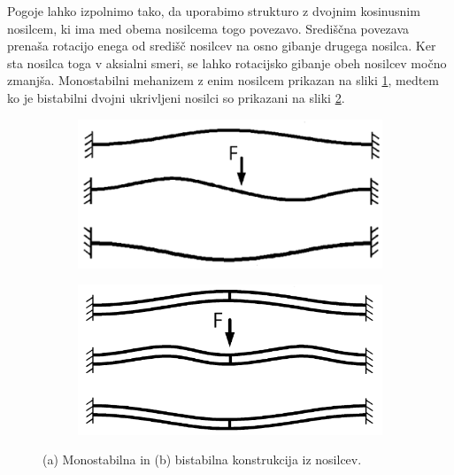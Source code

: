         Pogoje lahko izpolnimo tako, da uporabimo strukturo z dvojnim kosinusnim nosilcem, ki ima med obema nosilcema togo povezavo. Središčna povezava prenaša rotacijo enega od središč nosilcev na osno gibanje drugega nosilca. Ker sta nosilca toga v aksialni smeri, se lahko rotacijsko gibanje obeh nosilcev močno zmanjša. Monostabilni mehanizem z enim nosilcem prikazan na sliki \ref{fig:enojni_nosilec}, medtem ko je bistabilni dvojni ukrivljeni nosilci so prikazani na sliki \ref{fig:dvojni_nosilec}. 
        \begin{figure}[!htb]
                \centering
                \begin{subfigure}{.489\textwidth}
                    \centering
                    \includegraphics[width=\linewidth]{Magisterski praktikum/slike/teorija/enojni_nosilec.png}
                    \caption{}
                    \label{fig:enojni_nosilec}
                \end{subfigure}%
                \begin{subfigure}{.489\textwidth}
                    \centering
                    \includegraphics[width=\linewidth]{Magisterski praktikum/slike/teorija/dvojni_nosilec.png}
                    \caption{}
                    \label{fig:dvojni_nosilec}
                \end{subfigure}%
                \caption{(a) Monostabilna in (b) bistabilna konstrukcija iz nosilcev.}
                \label{fig:deformacijske_oblike}
        \end{figure}
        
